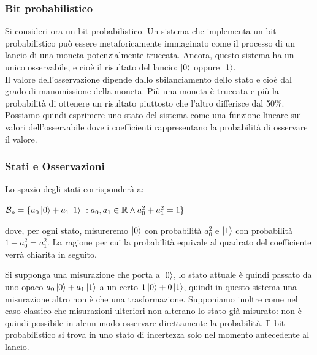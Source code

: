 \documentclass[12pt,a4paper,openright]{report}
\begin{document}
\subsubsection{Bit probabilistico}
Si consideri ora un bit probabilistico. Un sistema che implementa un bit probabilistico può essere metaforicamente immaginato come il processo di un lancio
di una moneta potenzialmente truccata. Ancora, questo sistema ha un unico osservabile, e cioè il risultato del lancio: $\ket{0}$ oppure $\ket1$.\\
Il valore dell'osservazione dipende dallo sbilanciamento dello stato e cioè dal grado di manomissione della moneta. Più una moneta è truccata e più la probabilità
di ottenere un risultato piuttosto che l'altro differisce dal 50$\%$. Possiamo quindi esprimere uno stato del sistema come una funzione lineare sui valori dell'osservabile
dove i coefficienti rappresentano la probabilità di osservare il valore. \newpage
\subsubsection{Stati e Osservazioni} 
Lo spazio degli stati corrisponderà a:

\begin{center}
    $ \mathcal{B}_p = \{a_0\ket0 + a_1\ket1 \ : a_0,a_1 \in{\mathbb{R}} \land a_0^2+a_1^2 = 1\}$
\end{center}

\noindent dove, per ogni stato, misureremo $\ket0$ con probabilità $a_0^2$ e $\ket1$ con probabilità $1 - a_0^2 = a_1^2$.
La ragione per cui la probabilità equivale al quadrato del coefficiente verrà chiarita in seguito.\par
Si supponga una misurazione che porta a $\ket0$, lo stato attuale è quindi passato da uno opaco $a_0\ket0 + a_1\ket1$ a un certo $1\ket0+0\ket1$,
quindi in questo sistema una misurazione altro non è che una trasformazione. Supponiamo inoltre come nel caso classico che misurazioni ulteriori non alterano lo stato già
misurato: non è quindi possibile in alcun modo osservare direttamente la probabilità. Il bit probabilistico si trova
in uno stato di incertezza solo nel momento antecedente al lancio.
\end{document}
